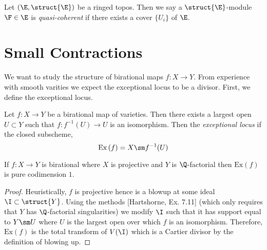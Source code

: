 \documentclass[12pt]{article}
\begin{document}
\begin{defn}
Let $(\E, \struct{\E})$ be a ringed topos. Then we say a $\struct{\E}$-module $\F \in \E$ is \textit{quasi-coherent} if there exists a cover $\{ U_i \}$ of $\E$.
\end{defn}

\section{Small Contractions}

We want to study the structure of birational maps $f : X \to Y$. From experience with smooth varities we expect the exceptional locus to be a divisor. First, we define the exceptional locus.

\newcommand{\Ex}[1]{\mathrm{Ex}\left(#1 \right)}

\begin{defn}
Let $f : X \to Y$ be a birational map of varieties. Then there exists a largest open $U \subset Y$ such that $f : f^{-1}(U) \to U$ is an isomorphism. Then the \textit{exceptional locus} if the closed subscheme,
\[ \Ex{f} = X \sm f^{-1}(U) \]
\end{defn}

\begin{prop}
If $f : X \to Y$ is birational where $X$ is projective and $Y$ is $\Q$-factorial then $\Ex{f}$ is pure codimension $1$.
\end{prop}

\begin{proof}
Heuristically, $f$ is projective hence is a blowup at some ideal $\I \subset \struct{Y}$. Using the methods [Hartshorne, Ex. 7.11] (which only requires that $Y$ has $\Q$-factorial singularities) we modify $\I$ such that it has support equal to $Y \sm U$ where $U$ is the largest open over which $f$ is an isomorphism. Therefore, $\Ex{f}$ is the total transform of $V(\I)$ which is a Cartier divisor by the definition of blowing up.
\end{proof}
\end{document}
